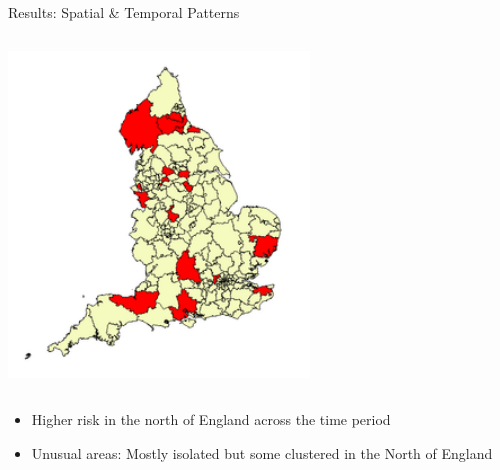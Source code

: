 \documentclass[slidestop,compress,serif,10pt]{beamer}
\begin{document}
\begin{frame}{Results: Spatial \& Temporal Patterns}
\begin{columns}
\begin{column}{0.5\textwidth}               
                 \includegraphics[width=0.6\textwidth]{outbreaks_map}
\end{column}
\end{columns}
\begin{itemize}
\vfill\item Higher risk in the north of England across the time period
\vfill\item Unusual areas: Mostly isolated but some clustered in the North of England
\end{itemize}

\fontsize{7}{7}


\end{frame}
\end{document}
